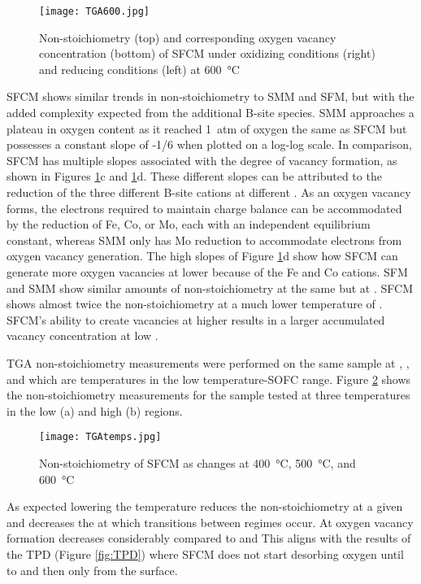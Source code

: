     \begin{figure}
      \texttt{[image: TGA600.jpg]}
      \caption{Non-stoichiometry (top) and corresponding oxygen vacancy concentration (bottom) of SFCM under oxidizing conditions (right) and reducing conditions (left) at \SI{600}{\celsius}}
      \label{fig:TGA600}
    \end{figure}

    SFCM shows similar trends in non-stoichiometry to SMM and SFM, but with the added complexity expected from the additional B-site species.
    SMM approaches a plateau in oxygen content as it reached \SI{1}{atm} of oxygen the same as SFCM but possesses a constant slope of -1/6 when plotted on a log-log scale.\cite{Marrero-lopez2010}
    In comparison, SFCM has multiple slopes associated with the degree of vacancy formation, as shown in Figures \ref{fig:TGA600}c and \ref{fig:TGA600}d.
    These different slopes can be attributed to the reduction of the three different B-site cations at different .
    As an oxygen vacancy forms, the electrons required to maintain charge balance can be accommodated by the reduction of Fe, Co, or Mo, each with an independent equilibrium constant, whereas SMM only has Mo reduction to accommodate electrons from oxygen vacancy generation.
    The high slopes of Figure \ref{fig:TGA600}d show how SFCM can generate more oxygen vacancies at lower  because of the Fe and Co cations.
    SFM and SMM show similar amounts of non-stoichiometry at the same  but at .\cite{Kircheisen2012}
    SFCM shows almost twice the non-stoichiometry at a much lower temperature of .
    SFCM's ability to create vacancies at higher  results in a larger accumulated vacancy concentration at low .

    TGA non-stoichiometry measurements were performed on the same sample at ,  , and  which are temperatures in the low temperature-SOFC range.
    Figure \ref{fig:TGAtemps} shows the non-stoichiometry measurements for the sample  tested at three temperatures in the low  (a) and high  (b) regions.

    \begin{figure}
      \texttt{[image: TGAtemps.jpg]}
      \caption{Non-stoichiometry of SFCM as  changes at \SI{400}{\celsius}, \SI{500}{\celsius}, and \SI{600}{\celsius}}
      \label{fig:TGAtemps}
    \end{figure}

    As expected lowering the temperature reduces the non-stoichiometry at a given  and decreases the  at which transitions between regimes occur.
    At  oxygen vacancy formation decreases considerably compared to  and 
    This aligns with the results of the TPD (Figure \ref{fig:TPD}) where SFCM does not start desorbing oxygen until  to  and then only from the surface.

